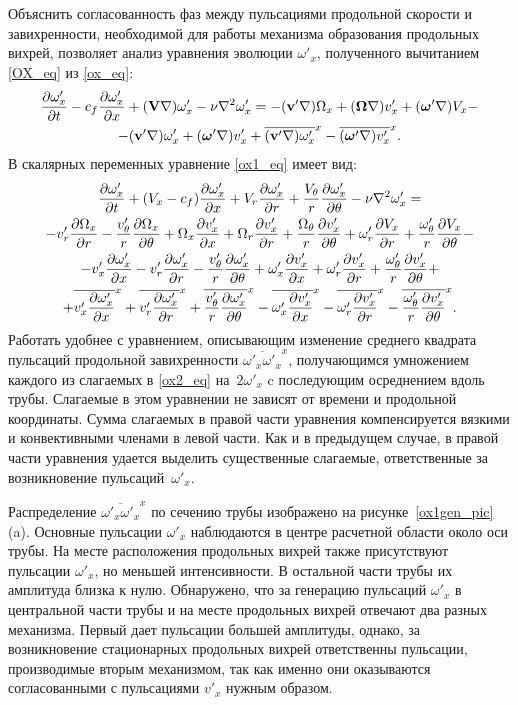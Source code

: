 Объяснить согласованность фаз между пульсациями продольной скорости и завихренности, необходимой для работы механизма образования продольных вихрей, позволяет анализ уравнения эволюции $\omega'_x$, полученного вычитанием \eqref{OX_eq} из \eqref{ox_eq}:
\begin{multline}\label{ox1_eq}
\frac{\partial \omega'_x}{\partial t} - c_f\frac{\partial \omega'_x}{\partial x} + (\mathbf{V}\nabla) \omega'_x - \nu \nabla^2 \omega'_x = - (\mathbf{v}'\nabla) \Omega_x
+(\mbox{\boldmath$\Omega$}\nabla) v'_x + (\mbox{\boldmath$\omega$}'\nabla) V_x - \\ - (\mathbf{v}'\nabla) \omega'_x  + (\mbox{\boldmath$\omega$}'\nabla) v'_x  + \overline{(\mathbf{v}'\nabla) \omega'_x}^x  - \overline{(\mbox{\boldmath$\omega$}'\nabla)v'_x}^x.
\end{multline}
В скалярных переменных уравнение \eqref{ox1_eq} имеет вид:
\begin{multline}\label{ox2_eq}
\frac{\partial \omega'_x}{\partial t} + (V_x - c_f)\frac{\partial \omega'_x}{\partial x} + V_r \frac{\partial \omega_x'}{\partial r} + \frac{V_\theta}{r} \frac{\partial \omega'_x}{\partial \theta} 
- \nu\nabla^2\omega'_x = \\
- v'_r \frac{\partial \Omega_x}{\partial r} - \frac{v'_\theta}{r} \frac{\partial \Omega_x}{\partial \theta} 
+ \Omega_x \frac{\partial v'_x}{\partial x} + \Omega_r \frac{\partial v'_x}{\partial r} + \frac{\Omega_\theta}{r} \frac{\partial v'_x}{\partial \theta}
+ \omega'_r \frac{\partial V_x}{\partial r} + \frac{\omega'_\theta}{r} \frac{\partial V_x}{\partial \theta} - \\ 
- v'_x \frac{\partial \omega'_x}{\partial x} - v'_r \frac{\partial \omega'_x}{\partial r} - \frac{v'_\theta}{r} \frac{\partial \omega'_x}{\partial \theta} 
+ \omega'_x \frac{\partial v'_x}{\partial x} + \omega'_r \frac{\partial v'_x}{\partial r} + \frac{\omega'_\theta}{r} \frac{\partial v'_x}{\partial \theta} + \\
+ \overline{v'_x \frac{\partial \omega'_x}{\partial x}}^x + \overline{v'_r \frac{\partial \omega'_x}{\partial r}}^x + \overline{\frac{v'_\theta}{r} \frac{\partial \omega'_x}{\partial \theta}}^x
- \overline{\omega'_x \frac{\partial v'_x}{\partial x}}^x - \overline{\omega'_r \frac{\partial v'_x}{\partial r}}^x - \overline{\frac{\omega'_\theta}{r} \frac{\partial v'_x}{\partial \theta}}^x.
\end{multline}
Работать удобнее с уравнением, описывающим изменение среднего квадрата пульсаций продольной завихренности $\overline{\omega'_x\omega'_x}^x$, получающимся умножением каждого из слагаемых в \eqref{ox2_eq} на~$2\omega'_x$ c последующим осреднением вдоль трубы. Слагаемые в этом уравнении не зависят от времени и продольной координаты. Сумма слагаемых в правой части уравнения компенсируется вязкими и конвективными членами в левой части. Как и в предыдущем случае, в правой части уравнения удается выделить существенные слагаемые, ответственные за возникновение пульсаций~$\omega'_x$. 


Распределение $\overline{\omega'_x \omega'_x}^x$ по сечению трубы изображено на рисунке~\ref{ox1gen_pic}(a). Основные пульсации $\omega'_x$ наблюдаются в центре расчетной области около оси трубы. На месте расположения продольных вихрей также присутствуют пульсации $\omega'_x$, но меньшей интенсивности. В остальной части трубы их амплитуда близка к нулю. Обнаружено, что за генерацию пульсаций $\omega'_x$ в центральной части трубы и на месте продольных вихрей отвечают два разных механизма. Первый дает пульсации большей амплитуды, однако, за возникновение стационарных продольных вихрей ответственны пульсации, производимые вторым механизмом, так как именно они оказываются согласованными с пульсациями $v'_x$ нужным образом.


